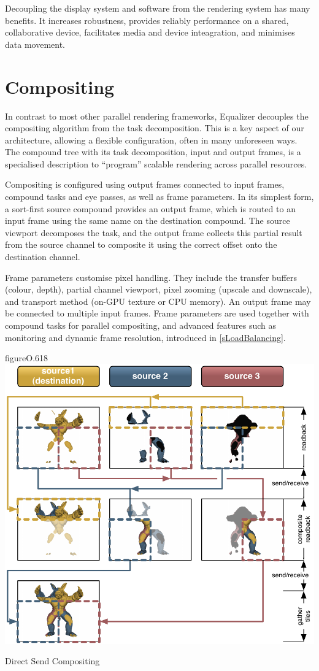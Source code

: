 Decoupling the display system and software from the rendering system has many
benefits. It increases robustness, provides reliably performance on a shared,
collaborative device, facilitates media and device inteagration, and minimises
data movement.

\section{Compositing}

In contrast to most other parallel rendering frameworks, Equalizer decouples the
compositing algorithm from the task decomposition. This is a key aspect of our
architecture, allowing a flexible configuration, often in many unforeseen
ways. The compound tree with its task decomposition, input and output frames, is
a specialised description to ``program''  scalable rendering across parallel
resources.

Compositing is configured using output frames connected to input frames,
compound tasks and eye passes, as well as frame parameters. In its simplest
form, a sort-first source compound provides an output frame, which is routed
to an input frame using the same name on the destination compound. The source
viewport decomposes the task, and the output frame collects this partial result
from the source channel to composite it using the correct offset onto the
destination channel.

Frame parameters customise pixel handling. They include the transfer buffers
(colour, depth), partial channel viewport, pixel zooming (upscale and
downscale), and transport method (on-GPU texture or CPU memory). An output
frame may be connected to multiple input frames. Frame parameters are used
together with compound tasks for parallel compositing, and advanced features
such as monitoring and dynamic frame resolution, introduced in
\cref{sLoadBalancing}.

\begin{wrapfloat}{figure}{O}{.618\textwidth}
  \includegraphics[width=.618\textwidth]{images/directSend}
  {\caption{\label{fDirectSend}Direct Send Compositing}}
\end{wrapfloat}


